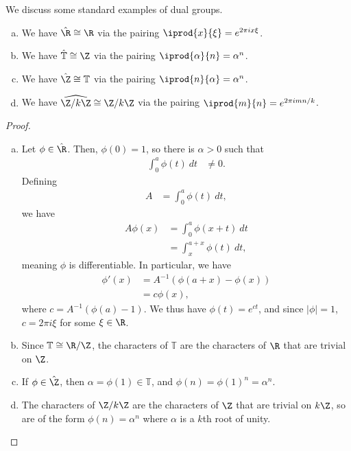 \documentclass[10pt]{mypackage}
\begin{document}
We discuss some standard examples of dual groups.
\begin{theorem}\hfill
  \begin{enumerate}[(a)]
    \item We have $\hat{\R}\cong \R$ via the pairing $ \iprod{x}{\xi} = e^{2\pi i x \xi} $.
    \item We have $\hat{ \mathbb{T} }\cong \Z$ via the pairing $ \iprod{\alpha}{n} = \alpha^{n} $.
    \item We have $ \hat{\Z}\cong \mathbb{T} $ via the pairing $ \iprod{n}{\alpha} = \alpha^{n} $.
    \item We have $ \widehat{\Z/k\Z}\cong \Z/k\Z $ via the pairing $ \iprod{m}{n} = e^{2\pi i m n/k} $.
  \end{enumerate}
\end{theorem}
\begin{proof}\hfill
  \begin{enumerate}[(a)]
    \item Let $\phi\in\hat{\R}$. Then, $\phi(0) = 1$, so there is $\alpha > 0$ such that
      \begin{align*}
        \int_{0}^{a} \phi(t)\:dt &\neq 0.
      \end{align*}
      Defining
      \begin{align*}
        A &= \int_{0}^{a} \phi(t)\:dt,
      \end{align*}
      we have
      \begin{align*}
        A\phi(x) &= \int_{0}^{a} \phi\left( x +t  \right)\:dt\\
                 &= \int_{x}^{a+x} \phi(t)\:dt,
      \end{align*}
      meaning $\phi$ is differentiable. In particular, we have
      \begin{align*}
        \phi'(x) &= A^{-1} \left( \phi\left( a+x \right)-\phi(x) \right)\\
                 &= c\phi(x),
      \end{align*}
      where $c = A^{-1}\left( \phi(a)-1 \right)$. We thus have $\phi(t) = e^{ct}$, and since $\left\vert \phi \right\vert = 1$, $c = 2\pi i \xi$ for some $\xi\in \R$.
    \item Since $ \mathbb{T} \cong \R/\Z $, the characters of $ \mathbb{T} $ are the characters of $\R$ that are trivial on $\Z$.
    \item If $\phi\in\hat{\Z}$, then $\alpha = \phi(1)\in \mathbb{T}$, and $\phi(n) = \phi(1)^{n} = \alpha^{n}$.
    \item The characters of $\Z/k\Z$ are the characters of $\Z$ that are trivial on $k\Z$, so are of the form $\phi(n) = \alpha^{n}$ where $\alpha$ is a $k$th root of unity.
  \end{enumerate}
\end{proof}
\end{document}
